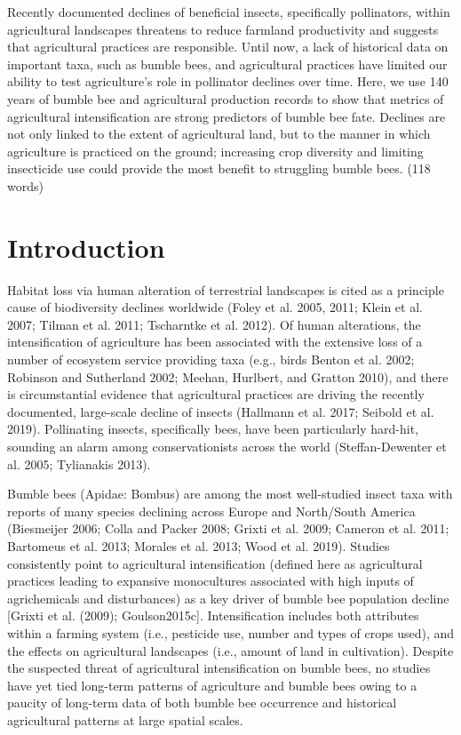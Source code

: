 \documentclass[11pt,]{article}
\begin{document}
Recently documented declines of beneficial insects, specifically
pollinators, within agricultural landscapes threatens to reduce farmland
productivity and suggests that agricultural practices are responsible.
Until now, a lack of historical data on important taxa, such as bumble
bees, and agricultural practices have limited our ability to test
agriculture's role in pollinator declines over time. Here, we use 140
years of bumble bee and agricultural production records to show that
metrics of agricultural intensification are strong predictors of bumble
bee fate. Declines are not only linked to the extent of agricultural
land, but to the manner in which agriculture is practiced on the ground;
increasing crop diversity and limiting insecticide use could provide the
most benefit to struggling bumble bees. (118 words)

\hypertarget{introduction}{%
\section{Introduction}\label{introduction}}

Habitat loss via human alteration of terrestrial landscapes is cited as
a principle cause of biodiversity declines worldwide (Foley et al. 2005,
2011; Klein et al. 2007; Tilman et al. 2011; Tscharntke et al. 2012). Of
human alterations, the intensification of agriculture has been
associated with the extensive loss of a number of ecosystem service
providing taxa (e.g., birds Benton et al. 2002; Robinson and Sutherland
2002; Meehan, Hurlbert, and Gratton 2010), and there is circumstantial
evidence that agricultural practices are driving the recently
documented, large-scale decline of insects (Hallmann et al. 2017;
Seibold et al. 2019). Pollinating insects, specifically bees, have been
particularly hard-hit, sounding an alarm among conservationists across
the world (Steffan-Dewenter et al. 2005; Tylianakis 2013).

Bumble bees (Apidae: Bombus) are among the most well-studied insect taxa
with reports of many species declining across Europe and North/South
America (Biesmeijer 2006; Colla and Packer 2008; Grixti et al. 2009;
Cameron et al. 2011; Bartomeus et al. 2013; Morales et al. 2013; Wood et
al. 2019). Studies consistently point to agricultural intensification
(defined here as agricultural practices leading to expansive
monocultures associated with high inputs of agrichemicals and
disturbances) as a key driver of bumble bee population decline {[}Grixti
et al. (2009); Goulson2015c{]}. Intensification includes both attributes
within a farming system (i.e., pesticide use, number and types of crops
used), and the effects on agricultural landscapes (i.e., amount of land
in cultivation). Despite the suspected threat of agricultural
intensification on bumble bees, no studies have yet tied long-term
patterns of agriculture and bumble bees owing to a paucity of long-term
data of both bumble bee occurrence and historical agricultural patterns
at large spatial scales.
\end{document}
